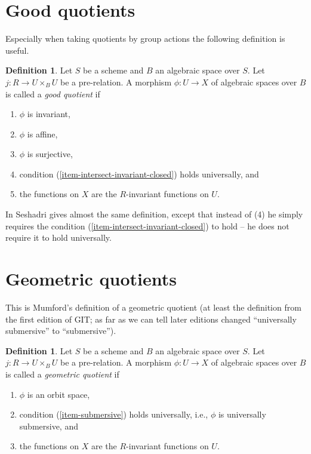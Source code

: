 \documentclass{stacks-project}
\theoremstyle{plain}
\theoremstyle{definition}
\newtheorem{definition}[subsection]{Definition}
\theoremstyle{remark}
\numberwithin{equation}{subsection}
\begin{document}
\section{Good quotients}
\label{section-good}

\noindent
Especially when taking quotients by group actions the following definition
is useful.

\begin{definition}
\label{definition-good}
Let $S$ be a scheme and $B$ an algebraic space over $S$.
Let $j : R \to U \times_B U$ be a pre-relation.
A morphism $\phi : U \to X$ of algebraic spaces over $B$
is called a {\it good quotient} if
\begin{enumerate}
\item $\phi$ is invariant,
\item $\phi$ is affine,
\item $\phi$ is surjective,
\item condition (\ref{item-intersect-invariant-closed}) holds universally, and
\item the functions on $X$ are the $R$-invariant functions on $U$.
\end{enumerate}
\end{definition}

\noindent
In \cite{seshadri_quotients} Seshadri gives almost the same definition,
except that instead of (4) he simply requires the condition
(\ref{item-intersect-invariant-closed}) to hold -- he does not require
it to hold universally.







\section{Geometric quotients}
\label{section-geometric}

\noindent
This is Mumford's definition of a geometric quotient (at least the definition
from the first edition of GIT; as far as we can tell later editions
changed ``universally submersive'' to ``submersive'').

\begin{definition}
\label{definition-geometric}
Let $S$ be a scheme and $B$ an algebraic space over $S$.
Let $j : R \to U \times_B U$ be a pre-relation.
A morphism $\phi : U \to X$ of algebraic spaces over $B$
is called a {\it geometric quotient} if
\begin{enumerate}
\item $\phi$ is an orbit space,
\item condition (\ref{item-submersive}) holds universally, i.e.,
$\phi$ is universally submersive, and
\item the functions on $X$ are the $R$-invariant functions on $U$.
\end{enumerate}
\end{definition}














\end{document}
